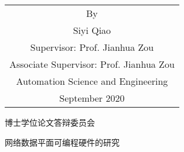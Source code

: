 \begin{titlepage}
\begin{center}
		\vspace{3cm}
		{\sanhao
			\begin{center} \renewcommand{\arraystretch}{1.5}
				\begin{tabular}{c}
					By \\
					Siyi Qiao \\
					Supervisor: Prof. Jianhua Zou \\
					Associate Supervisor: Prof. Jianhua Zou \\%
					Automation Science and Engineering \\
					September 2020 \\ %
				\end{tabular} \renewcommand{\arraystretch}{1}
			\end{center} 
		}
	\end{center}
	\clearpage{\pagestyle{empty}\cleardoublepage}
	
	\newpage\thispagestyle{empty}
	\begin{center}
		\parbox[t][0.7cm][t]{\textwidth}{}
		
		\begin{center}{\boldsong 博士学位论文答辩委员会}\end{center}
		
		\vspace{1cm}
		\begin{center}{\boldsong 网络数据平面可编程硬件的研究}\end{center}
		

\end{center}
\end{titlepage}

